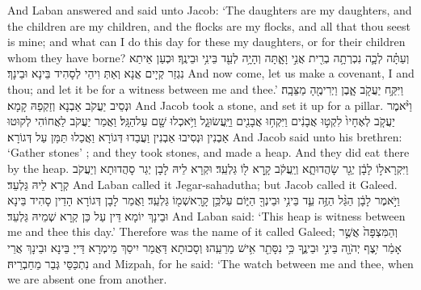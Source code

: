 {And Laban answered and said unto Jacob: ‘The daughters are my daughters, and the children are my children, and the flocks are my flocks, and all that thou seest is mine; and what can I do this day for these my daughters, or for their children whom they have borne?}{}
{וְעַתָּ֗ה לְכָ֛ה נִכְרְתָ֥ה בְרִ֖ית אֲנִ֣י וָאָ֑תָּה וְהָיָ֥ה לְעֵ֖ד בֵּינִ֥י וּבֵינֶֽךָ׃}
{וּכְעַן אֵיתַא נִגְזַר קְיָים אֲנָא וְאַתְּ וִיהֵי לְסָהִיד בֵּינָא וּבֵינָךְ׃}
{And now come, let us make a covenant, I and thou; and let it be for a witness between me and thee.’}{}
{וַיִּקַּ֥ח יַעֲקֹ֖ב אָ֑בֶן וַיְרִימֶ֖הָ מַצֵּבָֽה׃}
{וּנְסֵיב יַעֲקֹב אַבְנָא וְזַקְפַהּ קָמָא׃}
{And Jacob took a stone, and set it up for a pillar.}{}
{וַיֹּ֨אמֶר יַעֲקֹ֤ב לְאֶחָיו֙ לִקְט֣וּ אֲבָנִ֔ים וַיִּקְח֥וּ אֲבָנִ֖ים וַיַּֽעֲשׂוּ\maqqaf גָ֑ל וַיֹּ֥אכְלוּ שָׁ֖ם עַל\maqqaf הַגָּֽל׃}
{וַאֲמַר יַעֲקֹב לַאֲחוֹהִי לְקוּטוּ אַבְנִין וּנְסִיבוּ אַבְנִין וַעֲבַדוּ דְּגוֹרָא וַאֲכַלוּ תַּמָּן עַל דְּגוֹרָא׃}
{And Jacob said unto his brethren: ‘Gather stones’ ; and they took stones, and made a heap. And they did eat there by the heap.}{}
{וַיִּקְרָא\maqqaf ל֣וֹ לָבָ֔ן יְגַ֖ר שָׂהֲדוּתָ֑א וְיַֽעֲקֹ֔ב קָ֥רָא ל֖וֹ גַּלְעֵֽד׃}
{וּקְרָא לֵיהּ לָבָן יְגַר סָהֲדוּתָא וְיַעֲקֹב קְרָא לֵיהּ גַּלְעֵד׃}
{And Laban called it Jegar-sahadutha; but Jacob called it Galeed.}{}
{וַיֹּ֣אמֶר לָבָ֔ן הַגַּ֨ל הַזֶּ֥ה עֵ֛ד בֵּינִ֥י וּבֵינְךָ֖ הַיּ֑וֹם עַל\maqqaf כֵּ֥ן קָרָֽא\maqqaf שְׁמ֖וֹ גַּלְעֵֽד׃}
{וַאֲמַר לָבָן דְּגוֹרָא הָדֵין סָהִיד בֵּינָא וּבֵינָךְ יוֹמָא דֵּין עַל כֵּן קְרָא שְׁמֵיהּ גַּלְעֵד׃}
{And Laban said: ‘This heap is witness between me and thee this day.’ Therefore was the name of it called Galeed;}{}
{וְהַמִּצְפָּה֙ אֲשֶׁ֣ר אָמַ֔ר יִ֥צֶף יְהֹוָ֖ה בֵּינִ֣י וּבֵינֶ֑ךָ כִּ֥י נִסָּתֵ֖ר אִ֥ישׁ מֵרֵעֵֽהוּ׃}
{וְסָכוּתָא דַּאֲמַר יִיסַךְ מֵימְרָא דַּייָ בֵּינָא וּבֵינָךְ אֲרֵי נִתְכַּסֵּי גְּבַר מֵחַבְרֵיהּ׃}
{and Mizpah, for he said: ‘The \lord\space watch between me and thee, when we are absent one from another.}{}
